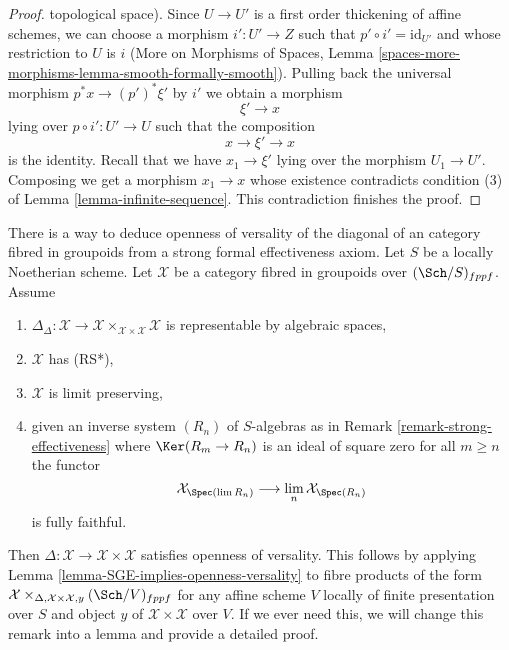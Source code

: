 \begin{proof}
topological space).
Since $U \to U'$ is a first order thickening of affine schemes,
we can choose a morphism $i' : U' \to Z$
such that $p' \circ i' = \text{id}_{U'}$ and
whose restriction to $U$ is $i$
(More on Morphisms of Spaces, Lemma
\ref{spaces-more-morphisms-lemma-smooth-formally-smooth}).
Pulling back the universal morphism
$p^*x \to (p')^*\xi'$ by $i'$ we obtain a morphism
$$
\xi' \to x
$$
lying over $p \circ i' : U' \to U$ such that the composition
$$
x \to \xi' \to x
$$
is the identity. Recall that we have $x_1 \to \xi'$ lying over
the morphism $U_1 \to U'$. Composing we get a morphism
$x_1 \to x$ whose existence contradicts condition
(3) of Lemma \ref{lemma-infinite-sequence}.
This contradiction finishes the proof.
\end{proof}

\begin{remark}
\label{remark-trade-openness-versality-diagonal-with-strong-effectiveness}
There is a way to deduce openness of versality of the diagonal
of an category fibred in groupoids from a strong formal effectiveness
axiom.
Let $S$ be a locally Noetherian scheme. Let $\mathcal{X}$ be a category fibred
in groupoids over $(\Sch/S)_{fppf}$. Assume
\begin{enumerate}
\item $\Delta_\Delta : \mathcal{X} \to
\mathcal{X} \times_{\mathcal{X} \times \mathcal{X}} \mathcal{X}$
is representable by algebraic spaces,
\item $\mathcal{X}$ has (RS*),
\item $\mathcal{X}$ is limit preserving,
\item given an inverse system $(R_n)$ of $S$-algebras
as in Remark \ref{remark-strong-effectiveness}
where $\Ker(R_m \to R_n)$ is an ideal of square zero for all $m \geq n$
the functor
$$
\mathcal{X}_{\Spec(\lim R_n)} \longrightarrow
\lim_n \mathcal{X}_{\Spec(R_n)}
$$
is fully faithful.
\end{enumerate}
Then $\Delta : \mathcal{X} \to \mathcal{X} \times \mathcal{X}$
satisfies openness of versality. This follows by applying
Lemma \ref{lemma-SGE-implies-openness-versality}
to fibre products of the form
$\mathcal{X} \times_{\Delta, \mathcal{X} \times \mathcal{X}, y}
(\Sch/V)_{fppf}$ for any affine scheme $V$ locally
of finite presentation over $S$ and object $y$ of
$\mathcal{X} \times \mathcal{X}$ over $V$.
If we ever need this, we will change this remark into
a lemma and provide a detailed proof.
\end{remark}











